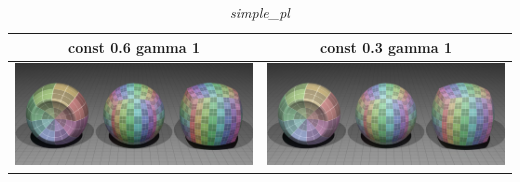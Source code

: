 \documentclass[11pt]{article}
\begin{document}
\begin{table}[ht]
  \centering
  \begin{tabular}{ | c | c | }
    \hline
    const 0.6 gamma 1 & const 0.3 gamma 1 \\ \hline
    \begin{minipage}{.3\textwidth}
      \includegraphics[scale=0.1]{img/obj/simple_pl/simple_pl_disney_dc03_dg1.jpg}
    \end{minipage}
    &
    \begin{minipage}{.3\textwidth}
      \includegraphics[scale=0.1]{img/obj/simple_pl/simple_pl_disney_dg1.jpg}
    \end{minipage}
    \\ \hline
  \end{tabular}
  \caption{\textit{simple\_pl}}\label{tbl:myLboro}
\end{table}
\end{document}
